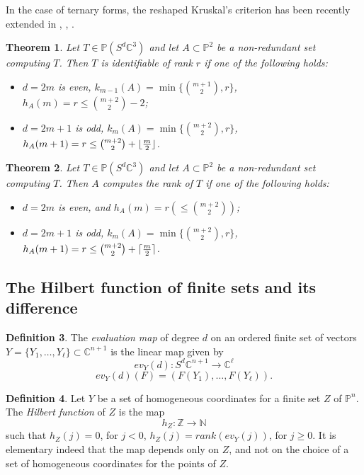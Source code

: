 \documentclass{amsart}
\newcommand{\C}{\mathbb{C}}
\newcommand{\Pj}{\mathbb{P}}
\newtheorem{thm0}{Theorem}[section]
\theoremstyle{definition}
\newtheorem{defn0}[thm0]{Definition}
\begin{document}
In the case of ternary forms, the reshaped Kruskal's criterion has been recently extended in \cite{AngeC}, \cite{Ball19}, \cite{MourOneto}. 

\begin{thm0}\label{range} Let $ T \in \Pj(S^{d} \C^{3}) $ and let $ A \subset \mathbb{P}^{2} $ be a non-redundant set computing $ T $. 
Then $T$  is identifiable of rank $r$  if one of the following holds:

\begin{itemize}
\item $d=2m$ is even, $k_{m-1}(A)= \min\{\binom{m+1}2,r\}$,  $h_A(m)=r\leq \binom{m+2}2-2$;

\item $d=2m+1$ is odd, $k_{m}(A)=\min\{\binom{m+2}2,r\}$, $h_A(m+1)=r\leq \binom{m+2}2 +\lfloor {m \over 2} \rfloor$.

\end{itemize}
\end{thm0}

\begin{thm0}\label{ranger} Let $ T \in \Pj(S^{d} \C^{3}) $ and let $ A \subset \mathbb{P}^{2} $ be a non-redundant set computing $ T $. 
Then $A$ computes the rank of  $T$  if one of the following holds:

\begin{itemize}
\item $d=2m$ is even,  and $h_A(m)=r (\leq \binom{m+2}2)$;

\item $d=2m+1$ is odd, $k_{m}(A)=\min\{\binom{m+2}2,r\}$, $h_A(m+1)=r\leq \binom{m+2}2 + \lceil {m \over 2} \rceil $.

\end{itemize}
\end{thm0}


\subsection{The Hilbert function of finite sets and its difference}\label{sec:hilb}

\begin{defn0}
The \emph{evaluation map} of degree $ d $ on an ordered finite set of vectors $ Y = \{Y_{1}, \ldots, Y_{\ell}\} \subset \mathbb{C}^{n+1} $ is the linear map given by
$$ ev_{Y}(d): S^{d}\mathbb{C}^{n+1} \longrightarrow \mathbb{C}^{\ell} $$
$$ ev_{Y}(d)(F) = (F(Y_{1}), \ldots, F(Y_{\ell})). $$
\end{defn0}

\begin{defn0}\label{Hilbdef}
Let $ Y $ be a set of homogeneous coordinates for a finite set $ Z $ of $ \mathbb{P}^{n} $. The \emph{Hilbert function} of $ Z $ is the map
$$ h_{Z}: \mathbb{Z} \longrightarrow \mathbb{N} $$
such that $ h_{Z}(j) = 0$, for $j < 0$, $ h_{Z}(j) = rank (ev_{Y}(j))$, for $ j \geq 0. $
It is elementary indeed that the map depends only on $Z$, and not on the choice of a set of homogeneous coordinates for the points of $Z$.
\end{defn0} 
\end{document}
